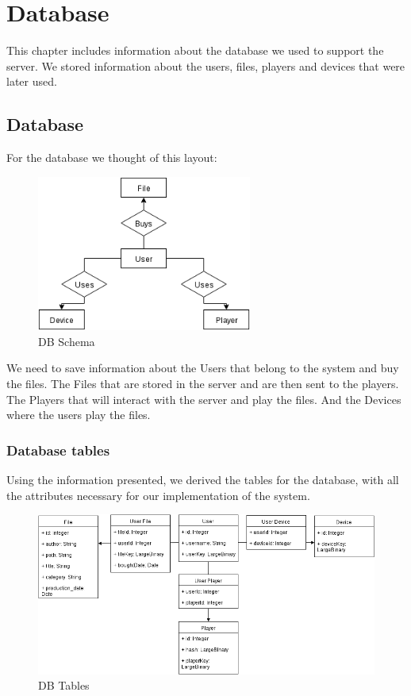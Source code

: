 \documentclass[11pt,a4paper]{report}
\begin{document}
\chapter{Database}
This chapter includes information about the database we used to support the server.
We stored information about the users, files, players and devices that were later used.

\section{Database}
For the database we thought of this layout:

\begin{figure}[H]
\centerline{\includegraphics[width=200pt]{images/dbSchema.png}}
\caption{DB Schema}
\label{schema}
\end{figure}

We need to save information about the Users that belong to the system and buy the files. The Files that are stored in the server and are then sent to the players. The Players that will interact with the server and play the files. And the Devices where the users play the files.

\subsection{Database tables}
Using the information presented, we derived the tables for the database, with all the attributes necessary for our implementation of the system.

\begin{figure}[H]
\centerline{\includegraphics[width=500pt]{images/dbTables.png}}
\caption{DB Tables}
\label{tables}
\end{figure}
\end{document}
